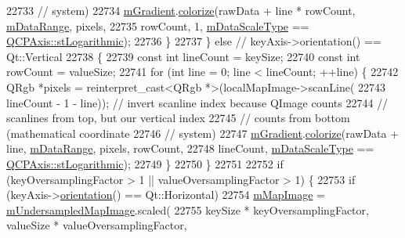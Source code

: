 \begin{DoxyCode}
22733                                   \textcolor{comment}{// system)}
22734       \hyperlink{class_q_c_p_color_map_aab77fe9a8df6f0486ab3507cc5f278fa}{mGradient}.\hyperlink{class_q_c_p_color_gradient_aaf423ceb943e177b0ed2c48c811d83dc}{colorize}(rawData + line * rowCount, \hyperlink{class_q_c_p_color_map_ab87609621d16cd3e9d52ad070b327b08}{mDataRange}, pixels,
22735                          rowCount, 1, \hyperlink{class_q_c_p_color_map_ab28a4b2def408f83b9818799d5f18446}{mDataScaleType} == 
      \hyperlink{class_q_c_p_axis_a36d8e8658dbaa179bf2aeb973db2d6f0abf5b785ad976618816dc6f79b73216d4}{QCPAxis::stLogarithmic});
22736     \}
22737   \} \textcolor{keywordflow}{else} \textcolor{comment}{// keyAxis->orientation() == Qt::Vertical}
22738   \{
22739     \textcolor{keyword}{const} \textcolor{keywordtype}{int} lineCount = keySize;
22740     \textcolor{keyword}{const} \textcolor{keywordtype}{int} rowCount = valueSize;
22741     \textcolor{keywordflow}{for} (\textcolor{keywordtype}{int} line = 0; line < lineCount; ++line) \{
22742       QRgb *pixels = \textcolor{keyword}{reinterpret\_cast<}QRgb *\textcolor{keyword}{>}(localMapImage->scanLine(
22743           lineCount - 1 - line)); \textcolor{comment}{// invert scanline index because QImage counts}
22744                                   \textcolor{comment}{// scanlines from top, but our vertical index}
22745                                   \textcolor{comment}{// counts from bottom (mathematical coordinate}
22746                                   \textcolor{comment}{// system)}
22747       \hyperlink{class_q_c_p_color_map_aab77fe9a8df6f0486ab3507cc5f278fa}{mGradient}.\hyperlink{class_q_c_p_color_gradient_aaf423ceb943e177b0ed2c48c811d83dc}{colorize}(rawData + line, \hyperlink{class_q_c_p_color_map_ab87609621d16cd3e9d52ad070b327b08}{mDataRange}, pixels, rowCount,
22748                          lineCount, \hyperlink{class_q_c_p_color_map_ab28a4b2def408f83b9818799d5f18446}{mDataScaleType} == 
      \hyperlink{class_q_c_p_axis_a36d8e8658dbaa179bf2aeb973db2d6f0abf5b785ad976618816dc6f79b73216d4}{QCPAxis::stLogarithmic});
22749     \}
22750   \}
22751 
22752   \textcolor{keywordflow}{if} (keyOversamplingFactor > 1 || valueOversamplingFactor > 1) \{
22753     \textcolor{keywordflow}{if} (keyAxis->\hyperlink{class_q_c_p_axis_a57483f2f60145ddc9e63f3af53959265}{orientation}() == Qt::Horizontal)
22754       \hyperlink{class_q_c_p_color_map_a66110813b42eca78b64095b2a1f285a0}{mMapImage} = \hyperlink{class_q_c_p_color_map_acad3d52f3572436d5f2e4057911ea8d3}{mUndersampledMapImage}.scaled(
22755           keySize * keyOversamplingFactor, valueSize * valueOversamplingFactor,

\end{DoxyCode}
